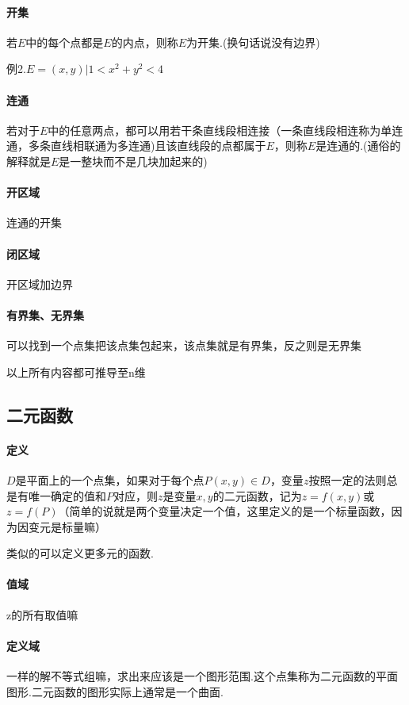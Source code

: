 \documentclass{ctexart}
\begin{document}
          
    \paragraph{开集}
      若$E$中的每个点都是$E$的内点，则称$E$为开集.(换句话说没有边界)

      例2.$E={(x,y)|1 < x^2+y^2 < 4}$
    \paragraph{连通}
      若对于$E$中的任意两点，都可以用若干条直线段相连接（一条直线段相连称为单连通，多条直线相联通为多连通)且该直线段的点都属于$E$，则称$E$是连通的.(通俗的解释就是$E$是一整块而不是几块加起来的)
    \paragraph{开区域}
      连通的开集
    \paragraph{闭区域}
      开区域加边界
    \paragraph{有界集、无界集}
      可以找到一个点集把该点集包起来，该点集就是有界集，反之则是无界集

    以上所有内容都可推导至n维
    \subsection{二元函数} 
      \paragraph{定义}
        $D$是平面上的一个点集，如果对于每个点$P(x,y) \in D$，变量$z$按照一定的法则总是有唯一确定的值和$P$对应，则$z$是变量$x,y$的二元函数，记为$z=f(x,y)$或$z=f(P)$（简单的说就是两个变量决定一个值，这里定义的是一个标量函数，因为因变元是标量嘛）

        类似的可以定义更多元的函数.
      \paragraph{值域}
        z的所有取值嘛
      \paragraph{定义域}
        一样的解不等式组嘛，求出来应该是一个图形范围.这个点集称为二元函数的平面图形.二元函数的图形实际上通常是一个曲面.
\end{document}

